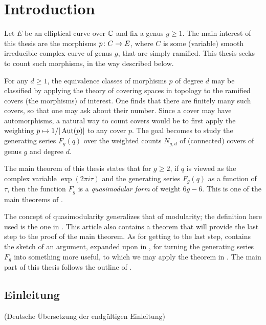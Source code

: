 \section{Introduction}
Let $E$ be an elliptical curve over $\mathbb{C}$ and fix a genus $g\geq 1$.
The main interest of this thesis are the morphisms $p\colon C\to E$, where $C$ is some (variable) smooth irreducible complex curve of genus $g$, that are simply ramified. This thesis seeks to count such morphisms, in the way described below.

For any $d\geq 1$, the equivalence classes of morphisms $p$ of degree $d$ may be classified by applying the theory of covering spaces in topology to the ramified covers (\ie the morphisms) of interest.
One finds that there are finitely many such covers, so that one may ask about their number. Since a cover may have automorphisms, a natural way to count covers would be to first apply the weighting $p\mapsto 1/|\operatorname{Aut}(p)|$ to any cover $p$.
The goal becomes to study the generating series $F_g(q)$ over the weighted counts $N_{g,d}$ of (connected) covers of genus $g$ and degree $d$.

The main theorem of this thesis states that for $g\geq 2$, if $q$ is viewed as the complex variable $\exp(2\pi i\tau)$ and the generating series $F_g(q)$ as a function of $\tau$, then the function $F_g$ is a \emph{quasimodular form} of weight $6g-6$. This is one of the main theorems of \cite{Dijkgraaf}.

The concept of quasimodularity generalizes that of modularity; the definition here used is the one in \cite{Kaneko-Zagier1995}. This article also contains a theorem that will provide the last step to the proof of the main theorem. As for getting to the last step, \cite{Dijkgraaf} contains the sketch of an argument, expanded upon in \cite{Roth}, for turning the generating series $F_g$ into something more useful, \ie to which we may apply the theorem in \cite{Kaneko-Zagier1995}. The main part of this thesis follows the outline of \cite{Roth}.

\subsection*{Einleitung}

(Deutsche Übersetzung der endgültigen Einleitung)